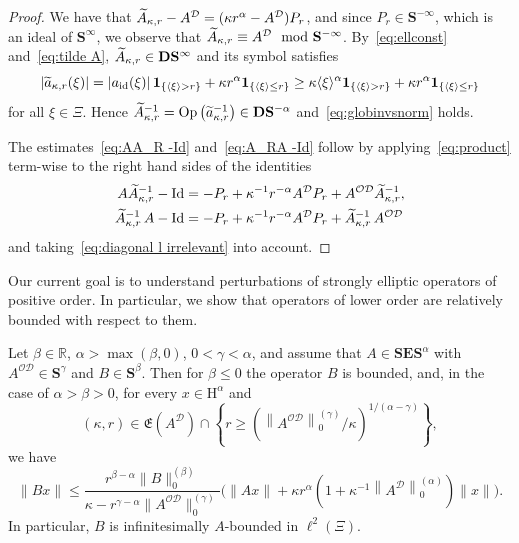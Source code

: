\documentclass[AHL,Unicode,longabstracts,published]{cedram}
\DeclareMathOperator{\Op}{Op}
\DeclareMathOperator{\Id}{Id}
\DeclareMathOperator{\id}{id}
\renewcommand{\mathsf}{\mathrm}
\newcommand{\sfH}{\mathsf{H}}
\newcommand{\R}{\mathbb R}
\newcommand{\CD}{\mathcal{D}}
\newcommand{\CO}{\mathcal{O}}
\newcommand{\bone}{\boldsymbol 1}
\newcommand{\BD}{\mathbf D}
\newcommand{\BE}{\mathbf E}
\newcommand{\BS}{\mathbf S}
\newcommand{\FE}{\mathfrak{E}}
\newcommand{\abs}[1]{\left\lvert #1 \right\rvert}
\newcommand{\set}[1]{\left\{ #1 \right\}}
\newcommand{\ang}[1]{\langle #1 \rangle}
\newcommand{\er}{r}
\let\oldtilde\tilde
\renewcommand*{\tilde}[1]{\mathchoice{\widetilde{#1}}{\widetilde{#1}}{\oldtilde{#1}}{\oldtilde{#1}}}
\begin{document}
\begin{proof}
We have that $\tilde A_{\kappa,\er} - A^{\CD} = (\kappa \er^\alpha - A^{\CD}) P_\er$, and since $P_\er \in \BS^{-\infty}$, which is an ideal of $\BS^\infty$, we observe that $\tilde A_{\kappa,\er} \equiv A^{\CD}
\mod{\BS^{-\infty}}$. By~\eqref{eq:ellconst} and~\eqref{eq:tilde A}, $\tilde A_{\kappa,\er}\in\BD\BS^\infty$ and its symbol satisfies
\begin{equation}
\abs{\tilde a_{\kappa, \er}(\xi)} = \abs{a_{\id}(\xi)}\bone_{\set{\ang \xi >\er}} +
\kappa \er^\alpha\bone_{\set{\ang \xi\le\er}} \ge \kappa \ang
\xi^\alpha\bone_{\set{\ang \xi>\er}} + \kappa \er^\alpha\bone_{\set{\ang \xi\le\er}}
\end{equation}
for all $\xi \in \Xi$. Hence $\tilde A_{\kappa,\er}^{-1} =\Op\big(\tilde a_{\kappa,\er}^{-1}\big)\in\BD\BS^{-\alpha}$ and~\eqref{eq:globinvsnorm} holds.

The estimates~\eqref{eq:AA_R -Id} and~\eqref{eq:A_RA -Id} follow by applying~\eqref{eq:product} term-wise to the right hand sides of the identities
\begin{equation*}
\begin{split}
A \tilde A_{\kappa,\er}^{-1} - \Id &= -P_\er +\kappa^{-1}\er^{-\alpha}A^{\CD}P_\er +A^{\CO\CD}\tilde A_{\kappa,\er}^{-1},\\
\tilde A_{\kappa,\er}^{-1}\,A - \Id &= -P_\er +\kappa^{-1}\er^{-\alpha}A^{\CD}P_\er +\tilde A_{\kappa,\er}^{-1}\,A^{\CO\CD}
\end{split}
\end{equation*}
and taking~\eqref{eq:diagonal l irrelevant} into account.
\end{proof}


Our current goal is to understand perturbations of strongly elliptic operators of positive order. In particular, we show that operators of lower order are relatively bounded with respect to them.

\begin{lemm}\label{lem:relative boundedness}
Let $\beta\in\R$, $\alpha>\max(\beta,0)$, $0 <\gamma < \alpha$, and assume that $A \in \BS\BE\BS^\alpha$ with $A^{\CO\CD}\in \BS^\gamma$ and $B \in \BS^\beta$. Then for $\beta\le 0$ the operator $B$ is bounded, and, in the case of $\alpha
>\beta >0$, for every $x\in\sfH^\alpha$ and
\[
(\kappa,
\er)\in\FE\left(A^\CD\right)\cap \left\{\er
\geq\left(\left\|A^{\CO\CD}\right\|_0^{(\gamma)}/\kappa\right)^{1/(\alpha
-\gamma)}\right\},
\]
we have
\begin{equation}\label{eq:infinitesimal estimate}
\|Bx\| \le \frac{\er^{\beta -\alpha}\|B\|_0^{(\beta)}}{\kappa -\er^{\gamma -\alpha}\|A^{\CO\CD}\|_0^{(\gamma)}}\Big(\|Ax\| +\kappa \er^{\alpha}\left(1 +\kappa^{-1}\left\|A^\CD\right\|_0^{(\alpha)}\right)\|x\|\Big).
\end{equation}
In particular, $B$ is infinitesimally $A$-bounded in $\ell^2(\Xi)$.
\end{lemm}
\end{document}
